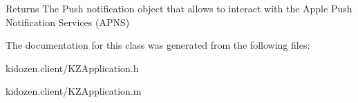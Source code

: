 \begin{DoxyReturn}{Returns}
The Push notification object that allows to interact with the Apple Push Notification Services (A\-P\-N\-S) 
\end{DoxyReturn}


The documentation for this class was generated from the following files\-:\begin{DoxyCompactItemize}
\item 
kidozen.\-client/K\-Z\-Application.\-h\item 
kidozen.\-client/K\-Z\-Application.\-m\end{DoxyCompactItemize}
